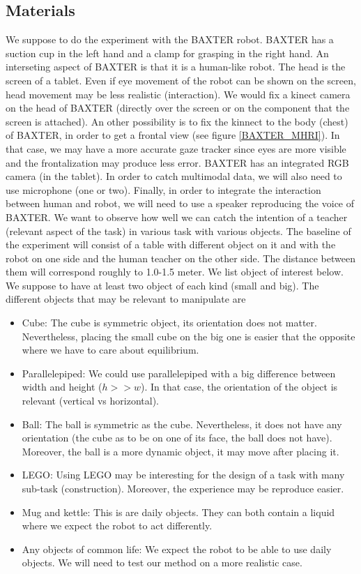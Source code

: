 \documentclass[11pt,a4paper]{article}
\begin{document}
\subsection{Materials}
We suppose to do the experiment with the BAXTER robot. BAXTER has a suction cup in the left hand and a clamp for grasping in the right hand. An interseting aspect of BAXTER is that it is a human-like robot. The head is the screen of a tablet. Even if eye movement of the robot can be shown on the screen, head movement may be less realistic (interaction). We would fix a kinect camera on the head of BAXTER (directly over the screen or on the component that the screen is attached). An other possibility is to fix the kinnect to the body (chest) of BAXTER, in order to get a frontal view (see figure \ref{BAXTER_MHRI}). In that case, we may have a more accurate gaze tracker since eyes are more visible and the frontalization may produce less error. BAXTER has an integrated RGB camera (in the tablet). In order to catch multimodal data, we will also need to use microphone (one or two). Finally, in order to integrate the interaction between human and robot, we will need to use a speaker reproducing the voice of BAXTER.
\newline
We want to observe how well we can catch the intention of a teacher (relevant aspect of the task) in various task with various objects. The baseline of the experiment will consist of a table with different object on it and with the robot on one side and the human teacher on the other side. The distance between them will correspond roughly to 1.0-1.5 meter. We list object of interest below. We suppose to have at least two object of each kind (small and big). The different objects that may be relevant to manipulate are
\begin{itemize}
\item Cube: The cube is symmetric object, its orientation does not matter. Nevertheless, placing the small cube on the big one is easier that the opposite where we have to care about equilibrium.
\item Parallelepiped: We could use parallelepiped with a big difference between width and height ($h>>w$). In that case, the orientation of the object is relevant (vertical vs horizontal).
\item Ball: The ball is symmetric as the cube. Nevertheless, it does not have any orientation (the cube as to be on one of its face, the ball does not have). Moreover, the ball is a more dynamic object, it may move after placing it.
\item LEGO: Using LEGO may be interesting for the design of a task with many sub-task (construction). Moreover, the experience may be reproduce easier.
\item Mug and kettle: This is are daily objects. They can both contain a liquid where we expect the robot to act differently.
\item Any objects of common life: We expect the robot to be able to use daily objects. We will need to test our method on a more realistic case.
\end{itemize}
\end{document}
